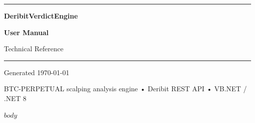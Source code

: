 \documentclass[11pt,a4paper]{article}
\begin{document}
\begin{titlepage}
  \noindent
  {\color{teal}\rule{\textwidth}{8pt}}

  \vspace*{3.5cm}

  \noindent
  {\fontsize{28pt}{34pt}\selectfont\bfseries\color{teal}%
    DeribitVerdictEngine\par}

  \vspace{0.4cm}
  \noindent
  {\fontsize{22pt}{28pt}\selectfont\bfseries\color{heading2}%
    User Manual\par}

  \vspace{0.3cm}
  \noindent
  {\fontsize{13pt}{18pt}\selectfont\color{mutedgray}%
    Technical Reference\par}

  \vspace{1.2cm}
  \noindent
  {\color{teal!40}\rule{\textwidth}{0.5pt}}

  \vspace{0.8cm}
  \noindent
  {\normalsize\color{mutedgray}%
    Generated \today\par}

  \vfill

  \noindent
  {\small\color{mutedgray}%
    BTC-PERPETUAL scalping analysis engine •
    Deribit REST API •
    VB.NET / .NET 8}
\end{titlepage}

\newpage
\thispagestyle{plain}
\tableofcontents
\newpage

$body$
\end{document}
